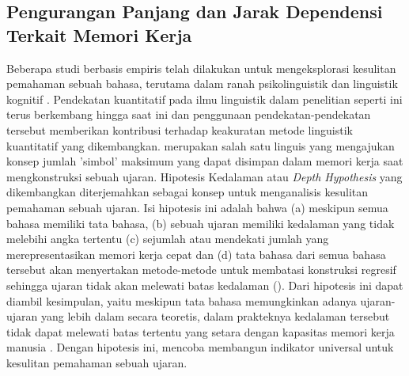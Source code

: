 \subsection{Pengurangan Panjang dan Jarak Dependensi Terkait Memori Kerja}
Beberapa studi berbasis empiris telah dilakukan untuk mengeksplorasi kesulitan pemahaman sebuah bahasa, terutama dalam ranah psikolinguistik dan linguistik kognitif \citep{jay2003psychology}. Pendekatan kuantitatif pada ilmu linguistik dalam penelitian seperti ini terus berkembang hingga saat ini dan penggunaan pendekatan-pendekatan tersebut memberikan kontribusi terhadap keakuratan metode linguistik kuantitatif yang dikembangkan. \cite{yngve1960model} merupakan salah satu linguis yang mengajukan konsep jumlah 'simbol' maksimum yang dapat disimpan dalam memori kerja saat mengkonstruksi sebuah ujaran. Hipotesis Kedalaman atau \textit{Depth Hypothesis} yang dikembangkan \cite{yngve1960model} diterjemahkan sebagai konsep untuk menganalisis kesulitan pemahaman sebuah ujaran. Isi hipotesis ini adalah bahwa (a) meskipun semua bahasa memiliki tata bahasa, (b) sebuah ujaran memiliki kedalaman yang tidak melebihi angka tertentu (c) sejumlah atau mendekati jumlah yang merepresentasikan memori kerja cepat dan (d) tata bahasa dari semua bahasa tersebut akan menyertakan metode-metode untuk membatasi konstruksi regresif sehingga ujaran tidak akan melewati batas kedalaman (\citealp{yngve1960model, yngve1996grammar}). Dari hipotesis ini dapat diambil kesimpulan, yaitu meskipun tata bahasa memungkinkan adanya ujaran-ujaran yang lebih dalam secara teoretis, dalam prakteknya kedalaman tersebut tidak dapat melewati batas tertentu yang setara dengan kapasitas memori kerja manusia \citealp{miller1956magical, cowan2001}. Dengan hipotesis ini, \cite{yngve1960model} mencoba membangun indikator universal untuk kesulitan pemahaman sebuah ujaran. 

